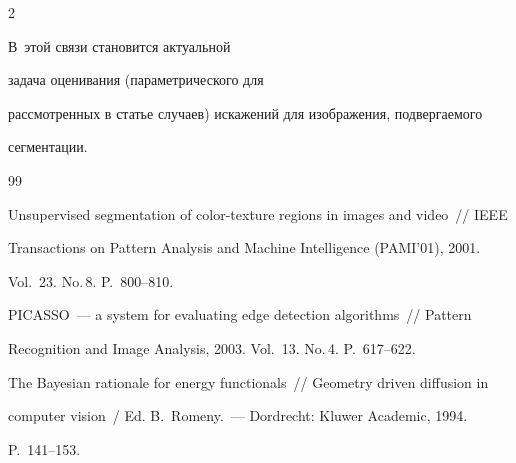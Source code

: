\begin{multicols}{2}
\begin{enumerate}[1.]
В~этой связи становится актуальной\linebreak


задача оценивания (параметрического для 


рассмотренных в статье случаев) искажений для изображения, подвергаемого 


сегментации.


  \end{enumerate}


  





  


  {\small\frenchspacing


{%




\begin{thebibliography}{99}


  






  Unsupervised segmentation of color-texture regions in images and video~// IEEE 


Transactions on Pattern Analysis and Machine Intelligence (PAMI'01), 2001. 


Vol.~23. No.\,8. P.~800--810.


  






  PICASSO~--- a system for evaluating edge detection algorithms~// Pattern 


Recognition and Image Analysis, 2003. Vol.~13. No.\,4. P.~617--622.









  The Bayesian rationale for energy functionals~// Geometry driven diffusion in 


computer vision~/ Ed. B.~Romeny.~--- Dordrecht: Kluwer Academic, 1994. 


P.~141--153.



\end{thebibliography}}}
\end{multicols}
